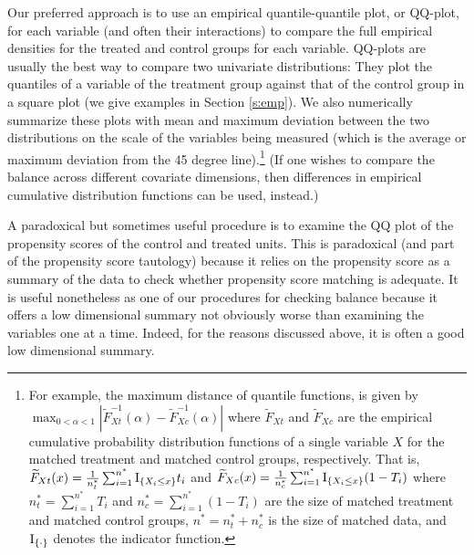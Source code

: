 \documentclass[11pt,titlepage]{article}
\begin{document}
Our preferred approach is to use an empirical quantile-quantile plot,
or QQ-plot, for each variable (and often their interactions) to
compare the full empirical densities for the treated and control
groups for each variable.  QQ-plots are usually the best way to
compare two univariate distributions: They plot the quantiles of a
variable of the treatment group against that of the control group in a
square plot (we give examples in Section \ref{s:emp}).  We also
numerically summarize these plots with mean and maximum deviation
between the two distributions on the scale of the variables being
measured (which is the average or maximum deviation from the 45 degree
line).\footnote{For example, the maximum distance of quantile
  functions, is given by $\max_{0 < \alpha < 1}
  |\widetilde{F}_{Xt}^{-1}(\alpha)-\widetilde{F}^{-1}_{Xc}(\alpha)|$
  where $\widetilde{F}_{Xt}$ and $\widetilde{F}_{Xc}$ are the
  empirical cumulative probability distribution functions of a single
  variable $X$ for the matched treatment and matched control groups,
  respectively. That is, $\widetilde{F}_{Xt}(x)=\frac{1}{n^*_t}
  \sum_{i=1}^{n^*} {\rm I}_{\{X_i \le x\}} t_i$ and
  $\widetilde{F}_{Xc}(x)=\frac{1}{n^*_c} \sum_{i=1}^{n^*} {\rm
    I}_{\{X_i \le x\}} (1-T_i)$ where $n^*_t=\sum_{i=1}^{n^*} T_i$ and
  $n^*_c=\sum_{i=1}^{n^*} (1-T_i)$ are the size of matched treatment
  and matched control groups, $n^*=n^*_t + n^*_c$ is the size of
  matched data, and ${\rm I}_{\{\cdot\}}$ denotes the indicator
  function.} (If one wishes to compare the balance across different
covariate dimensions, then differences in empirical cumulative
distribution functions can be used, instead.)

A paradoxical but sometimes useful procedure is to examine the QQ plot
of the propensity scores of the control and treated units.  This is
paradoxical (and part of the propensity score tautology) because it
relies on the propensity score as a summary of the data to check
whether propensity score matching is adequate.  It is useful
nonetheless as one of our procedures for checking balance because it
offers a low dimensional summary not obviously worse than 
examining the variables one at a time.  Indeed, for the reasons discussed
above, it is often a good low dimensional summary.
\end{document}
